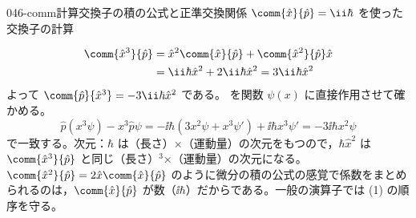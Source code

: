 \documentclass[uplatex,dvipdfmx,a4paper,11pt]{jsarticle}
\begin{document}
\begin{mondai}{046-comm}{計算}{交換子の積の公式と正準交換関係 $\comm{\hat{x}}{\hat{p}}=\ii\hbar$ を使った交換子の計算}
\begin{tadashii}
\begin{align*}
\comm{\hat{x}^{3}}{\hat{p}}&=\hat{x}^{2}\comm{\hat{x}}{\hat{p}}+\comm{\hat{x}^{2}}{\hat{p}}\hat{x}\\
&=\ii\hbar\hat{x}^{2}+2\ii\hbar\hat{x}^{2}=3\ii\hbar\hat{x}^{2}
\end{align*}
よって $\comm{\hat{p}}{\hat{x}^{3}}=-3\ii\hbar\hat{x}^{2}$ である。
\kenzan {} を関数 $\psi(x)$ に直接作用させて確かめる。
\[ \hat{p}(x^{3}\psi)-x^{3}\hat{p}\psi=-\ii\hbar\left(3x^{2}\psi+x^{3}\psi'\right)+\ii\hbar x^{3}\psi'=-3\ii\hbar x^{2}\psi \]
で一致する。次元：$\hbar$ は（長さ）×（運動量）の次元をもつので，$\hbar\hat{x}^{2}$ は $\comm{\hat{x}^{3}}{\hat{p}}$ と同じ（長さ）$^{3}$×（運動量）の次元になる。
\tsumazuki $\comm{\hat{x}^{2}}{\hat{p}}=2\hat{x}\comm{\hat{x}}{\hat{p}}$ のように微分の積の公式の感覚で係数をまとめられるのは，$\comm{\hat{x}}{\hat{p}}$ が数（$\ii\hbar$）だからである。一般の演算子では (1) の順序を守る。
\end{tadashii}
\end{mondai}
\end{document}
